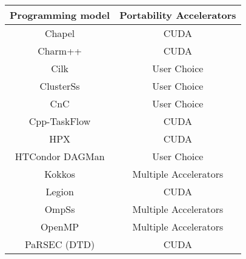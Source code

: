 \begin{tabular}{cc}
\hline
Programming model & Portability Accelerators \\
\hline
Chapel & CUDA\\
Charm++ & CUDA\\
Cilk & User Choice\\
ClusterSs & User Choice\\
CnC & User Choice\\
Cpp-TaskFlow & CUDA\\
HPX & CUDA\\
HTCondor DAGMan & User Choice\\
Kokkos & Multiple Accelerators\\
Legion & CUDA\\
OmpSs & Multiple Accelerators\\
OpenMP & Multiple Accelerators\\
PaRSEC (DTD) & CUDA\\
\hline
\end{tabular}
